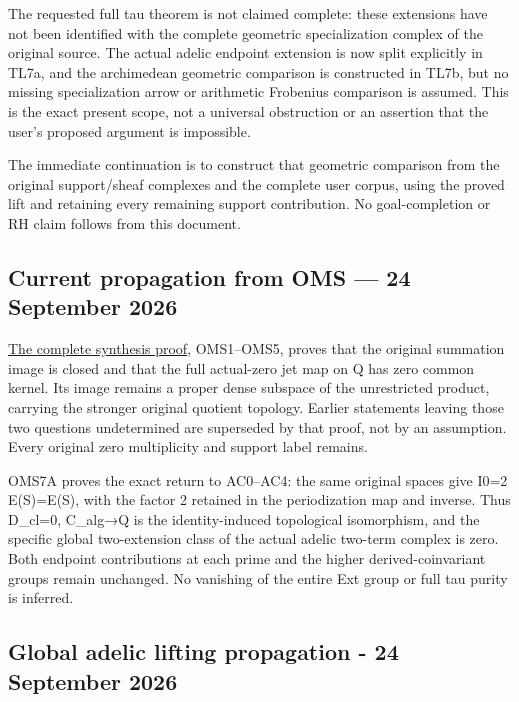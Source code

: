 The requested full tau theorem is not claimed complete: these extensions
have not been identified with the complete geometric specialization
complex of the original source. The actual adelic endpoint extension is
now split explicitly in TL7a, and the archimedean geometric comparison
is constructed in TL7b, but no missing specialization arrow or
arithmetic Frobenius comparison is assumed. This is the exact present
scope, not a universal obstruction or an assertion that the user's
proposed argument is impossible.

The immediate continuation is to construct that geometric comparison
from the original support/sheaf complexes and the complete user corpus,
using the proved lift and retaining every remaining support
contribution. No goal-completion or RH claim follows from this document.

\subsection{Current propagation from OMS --- 24 September
2026}\label{current-propagation-from-oms-24-september-2026-occurrence-3}

\href{ORIGINAL_MELLIN_SPECTRAL_SYNTHESIS.md}{The complete synthesis
proof}, OMS1--OMS5, proves that the original summation image is closed
and that the full actual-zero jet map on Q has zero common kernel. Its
image remains a proper dense subspace of the unrestricted product,
carrying the stronger original quotient topology. Earlier statements
leaving those two questions undetermined are superseded by that proof,
not by an assumption. Every original zero multiplicity and support label
remains.

OMS7A proves the exact return to AC0--AC4: the same original spaces give
I0=2 E(S)=E(S), with the factor 2 retained in the periodization map and
inverse. Thus D\_cl=0, C\_alg→Q is the identity-induced topological
isomorphism, and the specific global two-extension class of the actual
adelic two-term complex is zero. Both endpoint contributions at each
prime and the higher derived-coinvariant groups remain unchanged. No
vanishing of the entire Ext group or full tau purity is inferred.

\subsection{Global adelic lifting propagation - 24 September
2026}\label{global-adelic-lifting-propagation---24-september-2026-occurrence-4}

